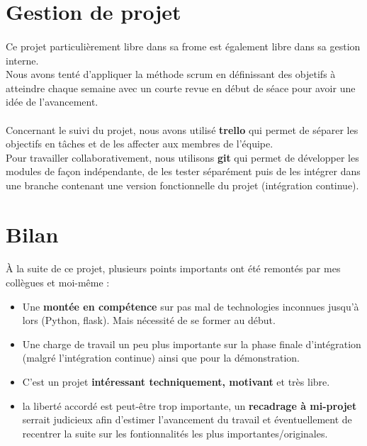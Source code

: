 \section{Gestion de projet}
\paragraph{} Ce projet particulièrement libre dans sa frome est également libre dans sa gestion interne.\\
Nous avons tenté d'appliquer la méthode scrum en définissant des objetifs à atteindre chaque semaine avec un courte revue en début de séace pour avoir une idée de l'avancement.\\

\paragraph{}Concernant le suivi du projet, nous avons utilisé \textbf{trello} qui permet de séparer les objectifs en t\^{a}ches et de les affecter aux membres de l'équipe.\\
Pour travailler collaborativement, nous utilisons \textbf{git} qui permet de développer les modules de façon indépendante, de les tester séparément puis de les intégrer dans une branche contenant une version fonctionnelle du projet (intégration continue).\\


\section{Bilan}
\paragraph{}\`{A} la suite de ce projet, plusieurs points importants ont été remontés par mes collègues et moi-m\^{e}me :
\begin{itemize}
\item Une \textbf{montée en compétence} sur pas mal de technologies inconnues jusqu'à lors (Python, flask). Mais nécessité de se former au début.
\item Une charge de travail un peu plus importante sur la phase finale d'intégration (malgré l'intégration continue) ainsi que pour la démonstration.
\item C'est un projet \textbf{intéressant techniquement, motivant} et très libre.
\item la liberté accordé est peut-être trop importante, un \textbf{recadrage à mi-projet} serrait judicieux afin d'estimer l'avancement du travail et éventuellement de recentrer la suite sur les fontionnalités les plus importantes/originales.
\end{itemize}
